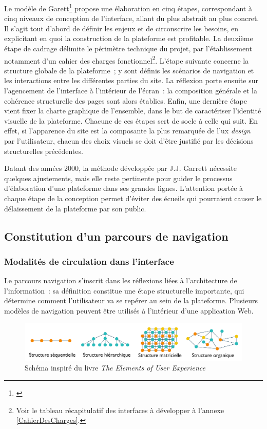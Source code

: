 \documentclass[a4paper,12pt,twoside]{book}
\newcommand{\ux}{\gls{ux} \emph{design}\xspace}
\begin{document}
Le modèle de Garett\footnote{\cite{garrettAdditionalResources}} propose une élaboration en cinq étapes, correspondant à cinq niveaux de conception de l'interface, allant du plus abstrait au plus concret. Il s'agit tout d'abord de définir les enjeux et de circonscrire les besoins, en explicitant en quoi la construction de la plateforme est profitable. La deuxième étape de cadrage délimite le périmètre technique du projet, par l'établissement notamment d'un cahier des charges fonctionnel\footnote{Voir le tableau récapitulatif des interfaces à développer à l'annexe \ref{CahierDesCharges}.}. L'étape suivante concerne la structure globale de la plateforme~; y sont définis les scénarios de navigation et les interactions entre les différentes parties du site. La réflexion porte ensuite sur l'agencement de l'interface à l'intérieur de l'écran~: la composition générale et la cohérence structurelle des pages sont alors établies. Enfin, une dernière étape vient fixer la charte graphique de l'ensemble, dans le but de caractériser l'identité visuelle de la plateforme. Chacune de ces étapes sert de socle à celle qui suit. En effet, si l'apparence du site est la composante la plus remarquée de l'\ux par l'utilisateur, chacun des choix visuels se doit d'être justifié par les décisions structurelles précédentes.

Datant des années 2000, la méthode développée par J.J. Garrett nécessite quelques ajustements, mais elle reste pertinente pour guider le processus d'élaboration d'une plateforme dans ses grandes lignes. L'attention portée à chaque étape de la conception permet d'éviter des écueils qui pourraient causer le délaissement de la plateforme par son public.

		\subsection{Constitution d'un parcours de navigation}
			\subsubsection{Modalités de circulation dans l'interface}
Le parcours navigation s'inscrit dans les réflexions liées à l'architecture de l'information~: sa définition constitue une étape structurelle importante, qui détermine comment l'utilisateur va se repérer au sein de la plateforme. Plusieurs modèles de navigation peuvent être utilisés à l'intérieur d'une application Web.

\begin{figure}[h!]
	\centering
	\includegraphics[width=15cm]{Images/Structure-navigation.png}
	\caption{Schéma inspiré du livre \emph{The Elements of User Experience}}
\end{figure}
\end{document}
